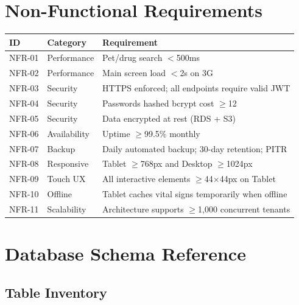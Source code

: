 \documentclass[12pt,a4paper]{report}
\begin{document}
\chapter{Non-Functional Requirements}

\begin{longtable}{L{2cm} L{2.5cm} L{9.5cm}}
\toprule
\textbf{ID} & \textbf{Category} & \textbf{Requirement} \\\midrule\endhead\bottomrule\endfoot
NFR-01 & Performance & Pet/drug search $<$500ms \\
NFR-02 & Performance & Main screen load $<$2s on 3G \\
NFR-03 & Security    & HTTPS enforced; all endpoints require valid JWT \\
NFR-04 & Security    & Passwords hashed bcrypt cost $\geq$12 \\
NFR-05 & Security    & Data encrypted at rest (RDS + S3) \\
NFR-06 & Availability & Uptime $\geq$99.5\% monthly \\
NFR-07 & Backup      & Daily automated backup; 30-day retention; PITR \\
NFR-08 & Responsive  & Tablet $\geq$768px and Desktop $\geq$1024px \\
NFR-09 & Touch UX    & All interactive elements $\geq$44$\times$44px on Tablet \\
NFR-10 & Offline     & Tablet caches vital signs temporarily when offline \\
NFR-11 & Scalability & Architecture supports $\geq$1,000 concurrent tenants \\
\end{longtable}

\chapter{Database Schema Reference}

\section{Table Inventory}
\end{document}
